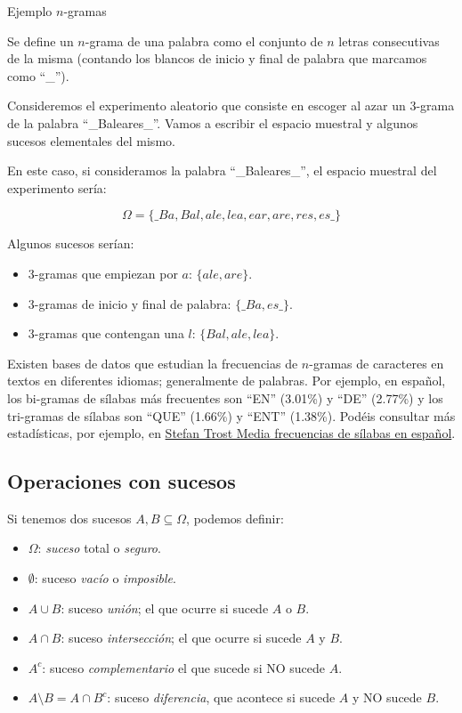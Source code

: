 \documentclass[
  letterpaper,
  DIV=11,
  numbers=noendperiod]{scrreprt}
\providecommand{\tightlist}{%
  \setlength{\itemsep}{0pt}\setlength{\parskip}{0pt}}\usepackage{longtable,booktabs,array}
\begin{document}
\begin{Ejemplo}{Ejemplo \(n\)-gramas}{}

Se define un \(n\)-grama de una palabra como el conjunto de \(n\) letras
consecutivas de la misma (contando los blancos de inicio y final de
palabra que marcamos como ``\_'').

Consideremos el experimento aleatorio que consiste en escoger al azar un
3-grama de la palabra ``\_Baleares\_''. Vamos a escribir el espacio
muestral y algunos sucesos elementales del mismo.

En este caso, si consideramos la palabra ``\_Baleares\_'', el espacio
muestral del experimento sería:

\[\Omega=\{\_Ba, Bal, ale, lea, ear, are, res, es\_\}\]

Algunos sucesos serían:

\begin{itemize}
\tightlist
\item
  3-gramas que empiezan por \(a\): \(\{ale,are\}.\)
\item
  3-gramas de inicio y final de palabra: \(\{\_Ba,es\_\}.\)
\item
  3-gramas que contengan una \(l\): \(\{Bal,ale,lea\}.\)
\end{itemize}

Existen bases de datos que estudian la frecuencias de \(n\)-gramas de
caracteres en textos en diferentes idiomas; generalmente de palabras.
Por ejemplo, en español, los bi-gramas de sílabas más frecuentes son
``EN'' (3.01\%) y ``DE'' (2.77\%) y los tri-gramas de sílabas son
``QUE'' (1.66\%) y ``ENT'' (1.38\%). Podéis consultar más estadísticas,
por ejemplo, en
\href{https://es.sttmedia.com/frecuencias-de-silabas-espanol}{Stefan
Trost Media frecuencias de sílabas en español}.

\end{Ejemplo}

\subsection{Operaciones con sucesos}\label{operaciones-con-sucesos}

Si tenemos dos sucesos \(A,B\subseteq \Omega\), podemos definir:

\begin{itemize}
\tightlist
\item
  \(\Omega\): \emph{suceso} total o \emph{seguro}.
\item
  \(\emptyset\): suceso \emph{vacío} o \emph{imposible}.
\item
  \(A\cup B\): suceso \emph{unión}; el que ocurre si sucede \(A\) o
  \(B\).
\item
  \(A\cap B\): suceso \emph{intersección}; el que ocurre si sucede \(A\)
  y \(B\).
\item
  \(A^c\): suceso \emph{complementario} el que sucede si NO sucede
  \(A\).
\item
  \(A\setminus B = A\cap B^c\): suceso \emph{diferencia}, que acontece
  si sucede \(A\) y NO sucede \(B\).
\end{itemize}
\end{document}
